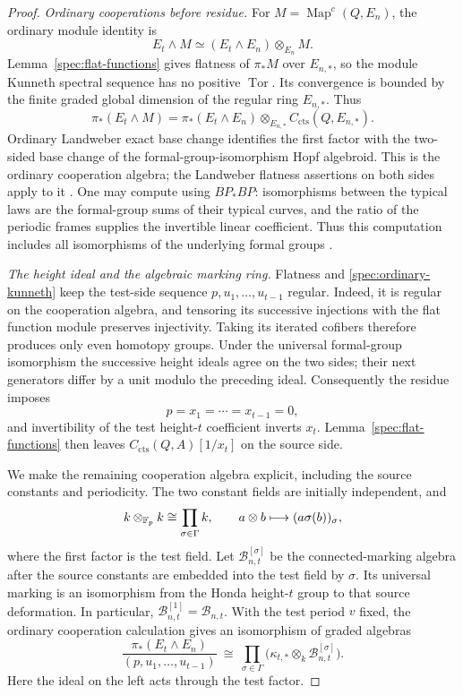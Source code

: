 \begin{proof}
\emph{Ordinary cooperations before residue.}
For \(M=\operatorname{Map}^c(Q,E_n)\), the ordinary module identity is
\[
E_t\wedge M\simeq
(E_t\wedge E_n)\otimes_{E_n}M.
\]
Lemma~\ref{spec:flat-functions} gives flatness of \(\pi_*M\) over
\(E_{n,*}\), so the module Kunneth spectral sequence has no positive
\(\operatorname{Tor}\). Its convergence is bounded by the finite
graded global dimension of the regular ring \(E_{n,*}\). Thus
\begin{equation}
\pi_*(E_t\wedge M)=
\pi_*(E_t\wedge E_n)\otimes_{E_{n,*}}
 C_{\mathrm{cts}}(Q,E_{n,*}).
\label{spec:ordinary-kunneth}
\end{equation}
Ordinary Landweber exact base change identifies the first factor
with the two-sided base change of the formal-group-isomorphism
Hopf algebroid. This is the ordinary cooperation algebra; the
Landweber flatness assertions on both sides apply to it
\cite[Example~0.1(d), Lemma~2.2 and Corollary~2.3]
{HoveyStrickland}.
One may compute using \(BP_*BP\): isomorphisms between the typical
laws are the formal-group sums of their typical curves, and the
ratio of the periodic frames supplies the invertible linear
coefficient. Thus this computation includes all isomorphisms of the
underlying formal groups
\cite[Definition~2.40, Remark~2.41(3) and Corollary~2.45]
{GoerssFormalGroups}.

\emph{The height ideal and the algebraic marking ring.}
Flatness and \eqref{spec:ordinary-kunneth} keep the test-side
sequence \(p,u_1,\ldots,u_{t-1}\) regular. Indeed, it is regular
on the cooperation algebra, and tensoring its successive injections
with the flat function module preserves injectivity. Taking its
iterated cofibers therefore produces only even homotopy groups.
Under the universal formal-group isomorphism the successive height
ideals agree on the two sides; their next generators differ by a
unit modulo the preceding ideal. Consequently the residue imposes
\[
p=x_1=\cdots=x_{t-1}=0,
\]
and invertibility of the test height-\(t\) coefficient inverts
\(x_t\). Lemma~\ref{spec:flat-functions} then leaves
\(C_{\mathrm{cts}}(Q,A)[1/x_t]\) on the source side.

We make the remaining cooperation algebra explicit, including the
source constants and periodicity. The two constant fields are
initially independent, and
\[
k\otimes_{\mathbb F_p}k\cong\prod_{\sigma\in\Gamma}k,
\qquad a\otimes b\longmapsto(a\sigma(b))_\sigma,
\]
where the first factor is the test field. Let
\(\mathcal B_{n,t}^{[\sigma]}\) be the connected-marking algebra
after the source constants are embedded into the test field by
\(\sigma\). Its universal marking is an isomorphism from the Honda
height-\(t\) group to that source deformation. In particular,
\(\mathcal B_{n,t}^{[1]}=\mathcal B_{n,t}\). With the test period
\(v\) fixed, the ordinary cooperation calculation gives an
isomorphism of graded algebras
\begin{equation}
\label{spec:residue-cooperation-algebra}
\frac{\pi_*(E_t\wedge E_n)}
     {(p,u_1,\ldots,u_{t-1})}
\ \cong\
\prod_{\sigma\in\Gamma}
 \bigl(\kappa_{t,*}\otimes_k\mathcal B_{n,t}^{[\sigma]}\bigr).
\end{equation}
Here the ideal on the left acts through the test factor.


\end{proof}

